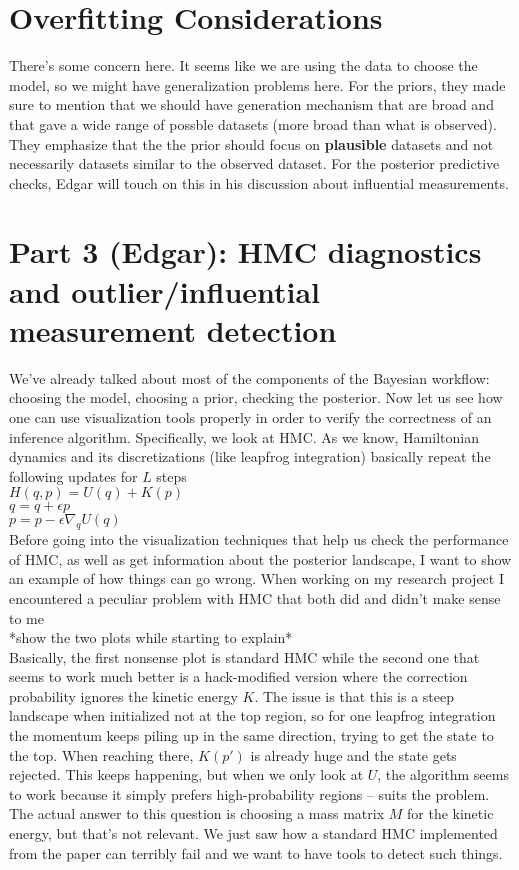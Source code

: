 \documentclass[]{article}
\begin{document}
\section*{Overfitting Considerations}
There's some concern here. It seems like we are using the data to choose the model,  so we might have generalization problems here. For the priors, they made sure to mention that we should have generation mechanism that are broad and that gave a wide range of possble datasets (more broad than what is observed). They emphasize that the the prior should focus on \textbf{plausible} datasets and not necessarily datasets similar to the observed dataset. For the posterior predictive checks, Edgar will touch on this in his discussion about influential measurements.

\section*{Part 3 (Edgar): HMC diagnostics and outlier/influential measurement detection}

We've already talked about most of the components of the Bayesian workflow: choosing the model, choosing a prior, checking the posterior. Now let us see how one can use visualization tools properly in order to verify the correctness of an inference algorithm. Specifically, we look at HMC. As we know, Hamiltonian dynamics and its discretizations (like leapfrog integration) basically repeat the following updates for $L$ steps \\

\noindent $ H(q, p) = U(q) + K(p) $ \\
$ q = q + \epsilon p $ \\
$ p = p - \epsilon \nabla_q U(q) $ \\

Before going into the visualization techniques that help us check the performance of HMC, as well as get information about the posterior landscape, I want to show an example of how things can go wrong. When working on my research project I encountered a peculiar problem with HMC that both did and didn't make sense to me \\

*show the two plots while starting to explain* \\

\noindent Basically, the first nonsense plot is standard HMC while the second one that seems to work much better is a hack-modified version where the correction probability ignores the kinetic energy $K$. The issue is that this is a steep landscape when initialized not at the top region, so for one leapfrog integration the momentum keeps piling up in the same direction, trying to get the state to the top. When reaching there, $K(p')$ is already huge and the state gets rejected. This keeps happening, but when we only look at $U$, the algorithm seems to work because it simply prefers high-probability regions -- suits the problem. The actual answer to this question is choosing a mass matrix $M$ for the kinetic energy, but that's not relevant. We just saw how a standard HMC implemented from the paper can terribly fail and we want to have tools to detect such things. \\
\end{document}

